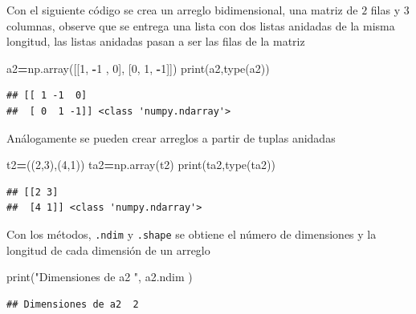 \documentclass[
]{book}
\newenvironment{Shaded}{\begin{snugshade}}{\end{snugshade}}
\newcommand{\BuiltInTok}[1]{#1}
\newcommand{\DecValTok}[1]{\textcolor[rgb]{0.00,0.00,0.81}{#1}}
\newcommand{\NormalTok}[1]{#1}
\newcommand{\OperatorTok}[1]{\textcolor[rgb]{0.81,0.36,0.00}{\textbf{#1}}}
\newcommand{\StringTok}[1]{\textcolor[rgb]{0.31,0.60,0.02}{#1}}
\theoremstyle{definition}
\theoremstyle{definition}
\theoremstyle{definition}
\theoremstyle{definition}
\theoremstyle{remark}
\begin{document}
Con el siguiente código se crea un arreglo bidimensional, una matriz de \(2\) filas y \(3\) columnas, observe que se entrega una lista con dos listas anidadas de la misma longitud, las listas anidadas pasan a ser las filas de la matriz

\begin{Shaded}
\begin{Highlighting}[]
\NormalTok{a2}\OperatorTok{=}\NormalTok{np.array([[}\DecValTok{1}\NormalTok{, }\OperatorTok{{-}}\DecValTok{1}\NormalTok{  , }\DecValTok{0}\NormalTok{], [}\DecValTok{0}\NormalTok{, }\DecValTok{1}\NormalTok{, }\OperatorTok{{-}}\DecValTok{1}\NormalTok{]])}
\BuiltInTok{print}\NormalTok{(a2,}\BuiltInTok{type}\NormalTok{(a2))}
\end{Highlighting}
\end{Shaded}

\begin{verbatim}
## [[ 1 -1  0]
##  [ 0  1 -1]] <class 'numpy.ndarray'>
\end{verbatim}

Análogamente se pueden crear arreglos a partir de tuplas anidadas

\begin{Shaded}
\begin{Highlighting}[]
\NormalTok{t2}\OperatorTok{=}\NormalTok{((}\DecValTok{2}\NormalTok{,}\DecValTok{3}\NormalTok{),(}\DecValTok{4}\NormalTok{,}\DecValTok{1}\NormalTok{)) }
\NormalTok{ta2}\OperatorTok{=}\NormalTok{np.array(t2)}
\BuiltInTok{print}\NormalTok{(ta2,}\BuiltInTok{type}\NormalTok{(ta2))}
\end{Highlighting}
\end{Shaded}

\begin{verbatim}
## [[2 3]
##  [4 1]] <class 'numpy.ndarray'>
\end{verbatim}

Con los métodos, \texttt{.ndim} y \texttt{.shape} se obtiene el número de dimensiones y la longitud de cada dimensión de un arreglo

\begin{Shaded}
\begin{Highlighting}[]
\BuiltInTok{print}\NormalTok{(}\StringTok{"Dimensiones de a2 "}\NormalTok{, a2.ndim )}
\end{Highlighting}
\end{Shaded}

\begin{verbatim}
## Dimensiones de a2  2
\end{verbatim}
\end{document}
